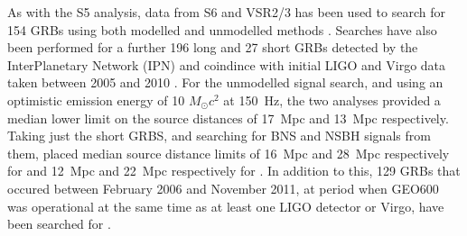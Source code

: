 As with the S5 analysis, data from S6 and VSR2/3 has been used to search for 154 GRBs using both modelled and 
unmodelled methods \cite{2012ApJ...760...12A}. Searches have also been performed for a further 196 long and 27 
short GRBs detected by the InterPlanetary Network (IPN) \cite{2003AIPC..662..473H} and coindince with initial 
LIGO and Virgo data taken between 2005 and 2010 \cite{2014PhRvL.113a1102A}. For the unmodelled signal 
search, and using an optimistic emission energy of 10 $M_{\odot}c^2$ at 150~Hz, the two analyses 
provided a median lower limit on the source distances of 17~Mpc \cite{2012ApJ...760...12A} and 13~Mpc 
\cite{2014PhRvL.113a1102A} respectively. Taking just the short GRBS, and searching for BNS and NSBH 
signals from them, placed median source distance limits of 16~Mpc and 28~Mpc respectively for 
\cite{2012ApJ...760...12A} and 12~Mpc and 22~Mpc respectively for \cite{2014PhRvL.113a1102A}. In addition to 
this, 129 GRBs that occured between February 2006 and November 2011, at period when GEO600 was operational at 
the same time as at least one LIGO detector or Virgo, have been searched for \cite{2014PhRvD..89l2004A}.

